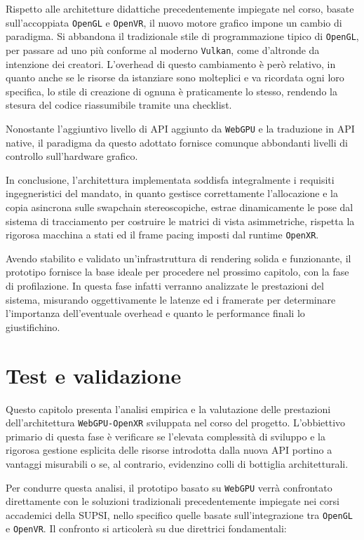 \documentclass[a4paper, 11pt, twoside]{report}
\newif\ifshowlogo
\newcommand{\blankpage}{
    \clearpage
    \thispagestyle{empty}     %
    \showlogofalse            %
    \hbox{}                   %
    \newpage
    \showlogotrue             %
}
\begin{document}
Rispetto alle architetture didattiche precedentemente impiegate nel corso, basate sull'accoppiata \texttt{OpenGL} e
\texttt{\gls{OpenVR}}, il nuovo motore grafico impone un cambio di paradigma.
Si abbandona il tradizionale stile di programmazione tipico di \texttt{OpenGL}, per passare ad uno più conforme al
moderno \texttt{\gls{Vulkan}}, come d'altronde da intenzione dei creatori.
L'overhead di questo cambiamento è però relativo, in quanto anche se le risorse da istanziare sono molteplici e va
ricordata ogni loro specifica, lo stile di creazione di ognuna è praticamente lo stesso, rendendo la stesura del
codice riassumibile tramite una checklist.

Nonostante l'aggiuntivo livello di API aggiunto da \texttt{WebGPU} e la traduzione in API native, il paradigma da questo
adottato fornisce comunque abbondanti livelli di controllo sull'hardware grafico.

In conclusione, l'architettura implementata soddisfa integralmente i requisiti ingegneristici del mandato, in quanto
gestisce correttamente l'allocazione e la copia asincrona sulle swapchain stereoscopiche, estrae dinamicamente le pose
dal sistema di tracciamento per costruire le matrici di vista asimmetriche, rispetta la rigorosa macchina a stati ed
il frame pacing imposti dal runtime \texttt{\gls{OpenXR}}.

Avendo stabilito e validato un'infrastruttura di rendering solida e funzionante, il prototipo fornisce la base ideale
per procedere nel prossimo capitolo, con la fase di profilazione. In questa fase infatti verranno analizzate le
prestazioni del sistema, misurando oggettivamente le latenze ed i \gls{framerate} per determinare l'importanza
dell'eventuale overhead e quanto le performance finali lo giustifichino.

\blankpage

\chapter{Test e validazione}

Questo capitolo presenta l'analisi empirica e la valutazione delle prestazioni dell'architettura \texttt{WebGPU-OpenXR}
sviluppata nel corso del progetto. L'obbiettivo primario di questa fase è verificare se l'elevata complessità di sviluppo
e la rigorosa gestione esplicita delle risorse introdotta dalla nuova API portino a vantaggi misurabili o se, al
contrario, evidenzino colli di bottiglia architetturali.

Per condurre questa analisi, il prototipo basato su \texttt{WebGPU} verrà confrontato direttamente con le soluzioni
tradizionali precedentemente impiegate nei corsi accademici della SUPSI, nello specifico quelle basate sull'integrazione
tra \texttt{OpenGL} e \texttt{\gls{OpenVR}}. Il confronto si articolerà su due direttrici fondamentali:
\end{document}
